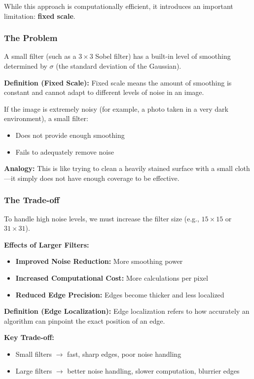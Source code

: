 \documentclass[12pt]{article}
\begin{document}
While this approach is computationally efficient, it introduces an important limitation: \textbf{fixed scale}.

\subsubsection*{The Problem}

A small filter (such as a $3 \times 3$ Sobel filter) has a built-in level of smoothing determined by $\sigma$ (the standard deviation of the Gaussian).

\textbf{Definition (Fixed Scale):}
Fixed scale means the amount of smoothing is constant and cannot adapt to different levels of noise in an image.

If the image is extremely noisy (for example, a photo taken in a very dark environment), a small filter:
\begin{itemize}
    \item Does not provide enough smoothing
    \item Fails to adequately remove noise
\end{itemize}

\textbf{Analogy:}
This is like trying to clean a heavily stained surface with a small cloth—it simply does not have enough coverage to be effective.

\subsubsection*{The Trade-off}

To handle high noise levels, we must increase the filter size (e.g., $15 \times 15$ or $31 \times 31$).

\textbf{Effects of Larger Filters:}
\begin{itemize}
    \item \textbf{Improved Noise Reduction:} More smoothing power
    \item \textbf{Increased Computational Cost:} More calculations per pixel
    \item \textbf{Reduced Edge Precision:} Edges become thicker and less localized
\end{itemize}

\textbf{Definition (Edge Localization):}
Edge localization refers to how accurately an algorithm can pinpoint the exact position of an edge.

\textbf{Key Trade-off:}
\begin{itemize}
    \item Small filters $\rightarrow$ fast, sharp edges, poor noise handling
    \item Large filters $\rightarrow$ better noise handling, slower computation, blurrier edges
\end{itemize}
\end{document}

